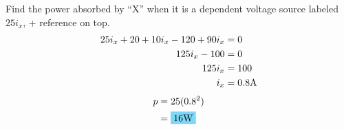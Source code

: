 Find the power absorbed by ``X'' when it is a dependent voltage source labeled $25i_x$, + reference on top.
\begin{align*}
	25i_x +20 + 10i_x -120 + 90i_x &=0 \\
	125i_x-100&=0 \\
	125i_x&=100 \\
	i_x&=0.8\qw{\A}
\end{align*}
\begin{align*}
	p&=25(0.8^2) \\
	&=\hlbox{16\qw{\W}}
\end{align*}